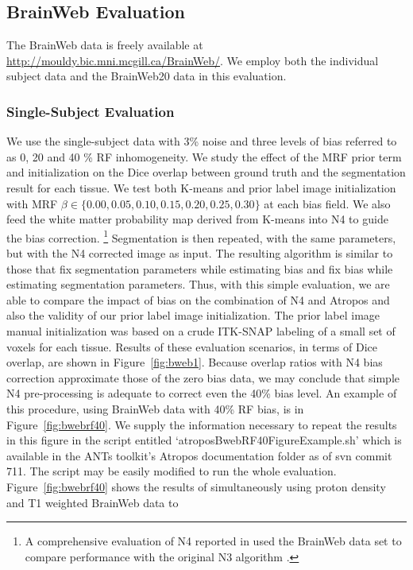 \documentclass[11pt,english]{article}
\begin{document}
\subsection{BrainWeb Evaluation}
\label{sec:bweb} The BrainWeb data is freely available at
\url{http://mouldy.bic.mni.mcgill.ca/BrainWeb/}.  We employ both the
individual subject data and the BrainWeb20 data in this evaluation.
\subsubsection{Single-Subject Evaluation} We use the single-subject
data with 3\% noise and three levels of bias referred to as 0, 20 and 40 \% RF inhomogeneity.  We
study the effect of the MRF prior term and initialization on
the Dice overlap between ground truth and the segmentation result for
each tissue.  We test both K-means and prior label image
initialization with MRF $\beta \in \{ 0.00 , 0.05 , 0.10 , 0.15 , 0.20, 
0.25 , 0.30 \}$ at each bias field.  We also feed the white matter
probability map derived from K-means into N4 to guide the bias
correction.%
\footnote{
A comprehensive evaluation of N4 reported in \cite{Tustison2010} used the BrainWeb data set
to compare performance with the original N3 algorithm \citep{Sled1998}.
}
Segmentation is then repeated, with the same parameters,
but with the N4 corrected image as input.  The resulting algorithm is
similar to those that fix segmentation parameters while
estimating bias and fix bias while estimating segmentation parameters.
Thus, with this simple evaluation, we are able to compare the impact
of bias on the combination of N4 and Atropos and also the validity of our
prior label image initialization.  The prior label image manual
initialization was based on a crude ITK-SNAP labeling of a small
set of voxels for each tissue.  Results of these evaluation scenarios, in terms of
Dice overlap, are shown in Figure~\ref{fig:bweb1}. Because overlap
ratios with N4 bias correction approximate those of the zero bias data, we may
conclude that simple N4 pre-processing is adequate to correct even the 40\%
bias level.  An example of this procedure, using BrainWeb data with 40\% RF bias,
is in Figure~\ref{fig:bwebrf40}.  We supply the information necessary
to repeat the results in this figure in the script entitled
`{\ttfamily atroposBwebRF40FigureExample.sh}' which is available in
the ANTs toolkit's Atropos documentation folder as of svn commit 711.
The script may be easily modified to run the whole
evaluation.  Figure~\ref{fig:bwebrf40} shows the results of
simultaneously using proton density and T1 weighted BrainWeb data to
\end{document}
